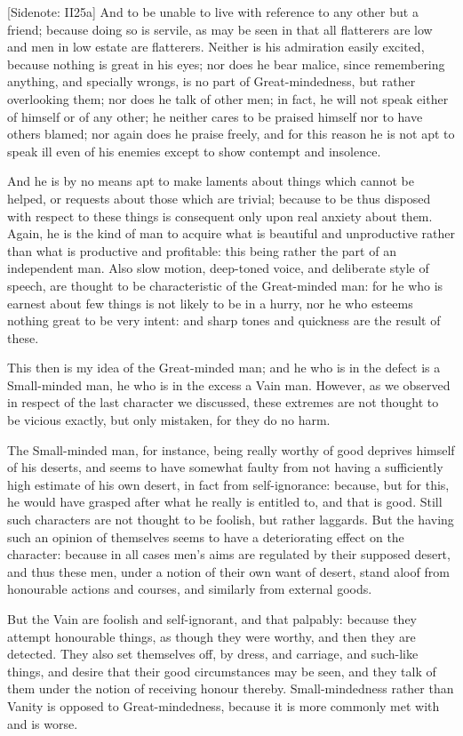 [Sidenote: II25a] And to be unable to live with reference to any other
but a friend; because doing so is servile, as may be seen in that all
flatterers are low and men in low estate are flatterers. Neither is his
admiration easily excited, because nothing is great in his eyes; nor
does he bear malice, since remembering anything, and specially wrongs,
is no part of Great-mindedness, but rather overlooking them; nor does he
talk of other men; in fact, he will not speak either of himself or of
any other; he neither cares to be praised himself nor to have others
blamed; nor again does he praise freely, and for this reason he is
not apt to speak ill even of his enemies except to show contempt and
insolence.

And he is by no means apt to make laments about things which cannot be
helped, or requests about those which are trivial; because to be thus
disposed with respect to these things is consequent only upon real
anxiety about them. Again, he is the kind of man to acquire what
is beautiful and unproductive rather than what is productive and
profitable: this being rather the part of an independent man. Also slow
motion, deep-toned voice, and deliberate style of speech, are thought to
be characteristic of the Great-minded man: for he who is earnest about
few things is not likely to be in a hurry, nor he who esteems nothing
great to be very intent: and sharp tones and quickness are the result of
these.

This then is my idea of the Great-minded man; and he who is in the
defect is a Small-minded man, he who is in the excess a Vain man.
However, as we observed in respect of the last character we discussed,
these extremes are not thought to be vicious exactly, but only mistaken,
for they do no harm.

The Small-minded man, for instance, being really worthy of good deprives
himself of his deserts, and seems to have somewhat faulty from not
having a sufficiently high estimate of his own desert, in fact from
self-ignorance: because, but for this, he would have grasped after what
he really is entitled to, and that is good. Still such characters are
not thought to be foolish, but rather laggards. But the having such
an opinion of themselves seems to have a deteriorating effect on the
character: because in all cases men's aims are regulated by their
supposed desert, and thus these men, under a notion of their own want of
desert, stand aloof from honourable actions and courses, and similarly
from external goods.

But the Vain are foolish and self-ignorant, and that palpably: because
they attempt honourable things, as though they were worthy, and then
they are detected. They also set themselves off, by dress, and carriage,
and such-like things, and desire that their good circumstances may
be seen, and they talk of them under the notion of receiving
honour thereby. Small-mindedness rather than Vanity is opposed to
Great-mindedness, because it is more commonly met with and is worse.

